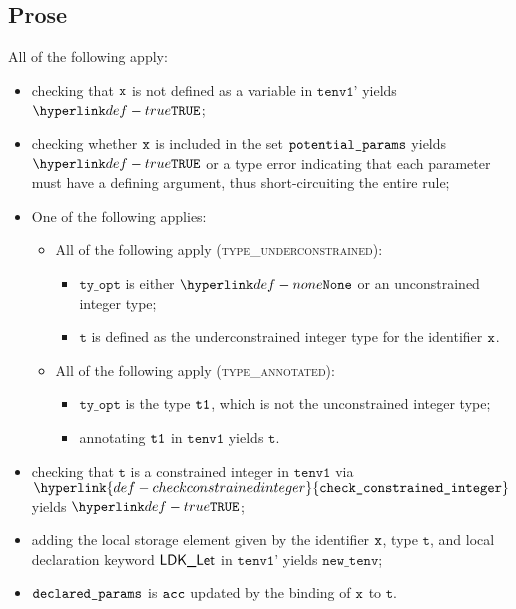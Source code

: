 \documentclass{book}
\newcommand\ProseOrTypeError[0]{\ProseTerminateAs{\TypeErrorConfig}}
\newcommand\checkconstrainedinteger[0]{\hyperlink{def-checkconstrainedinteger}{\texttt{check\_constrained\_integer}}}
\newcommand\newtenv[0]{\texttt{new\_tenv}}
\newcommand\tenvone[0]{\texttt{tenv1}}
\newcommand\tenvonep[0]{\texttt{tenv1'}}
\newcommand\vt[0]{\texttt{t}}
\newcommand\tyopt[0]{\texttt{ty\_opt}}
\begin{document}
\subsection{Prose}
All of the following apply:
\begin{itemize}
  \item checking that $\texttt{x}$ is not defined as a variable in $\tenvonep$ yields $\True$\ProseOrTypeError;
  \item checking whether $\texttt{x}$ is included in the set $\texttt{potential\_params}$ yields $\True$ or a type error
        indicating that each parameter must have a defining argument, thus short-circuiting the entire rule;
  \item One of the following applies:
  \begin{itemize}
    \item All of the following apply (\textsc{type\_underconstrained}):
    \begin{itemize}
      \item $\tyopt$ is either $\None$ or an unconstrained integer type;
      \item $\vt$ is defined as the underconstrained integer type for the identifier $\texttt{x}$.
    \end{itemize}

    \item All of the following apply (\textsc{type\_annotated}):
    \begin{itemize}
      \item $\tyopt$ is the type $\texttt{t1}$, which is not the unconstrained integer type;
      \item annotating $\texttt{t1}$ in $\tenvone$ yields $\vt$\ProseOrTypeError.
    \end{itemize}
  \end{itemize}
  \item checking that $\vt$ is a constrained integer in $\tenvone$ via $\checkconstrainedinteger$
        yields $\True$\ProseOrTypeError;
  \item adding the local storage element given by the identifier $\texttt{x}$, type $\vt$, and local declaration keyword
        $\textsf{LDK\_Let}$ in $\tenvonep$ yields $\newtenv$;
  \item $\texttt{declared\_params}$ is $\texttt{acc}$ updated by the binding of $\texttt{x}$ to $\vt$.
\end{itemize}
\end{document}
